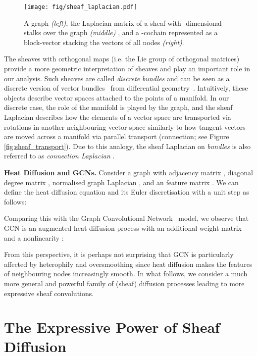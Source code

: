 \documentclass{article}
\begin{document}
\begin{figure}[t]
    \centering
    \texttt{[image: fig/sheaf\_laplacian.pdf]}
    \caption{A graph \textit{(left)}, the Laplacian matrix of a sheaf with -dimensional stalks over the graph \textit{(middle)} , and a -cochain  represented as a block-vector stacking the vectors of all nodes  \textit{(right)}.}
    \label{fig:sheaf_laplacian}
    \vspace{-10pt}
\end{figure}

The sheaves with orthogonal maps (i.e.  the Lie group of  orthogonal matrices) provide a more geometric interpretation of sheaves and play an important role in our analysis. Such sheaves are called \emph{discrete}  \emph{bundles} and can be seen as a discrete version of vector bundles~\citep{zein2009local, scoccola2021approximate, gao2021geometry} from differential geometry~\citep{tu2011manifolds}. Intuitively, these objects describe vector spaces attached to the points of a manifold. In our discrete case, the role of the manifold is played by the graph, and the sheaf Laplacian describes how the elements of a vector space are transported via rotations in another neighbouring vector space similarly to how tangent vectors are moved across a manifold via parallel transport (connection; see Figure \ref{fig:sheaf_transport}). Due to this analogy, the sheaf Laplacian on  \emph{bundles} is also referred to as {\em connection Laplacian} \citep{singer2012vector}.

\textbf{Heat Diffusion and GCNs. } Consider a graph with adjacency matrix , diagonal degree matrix , normalised graph Laplacian , and an  feature matrix . We can define the heat diffusion equation and its Euler discretisation with a unit step as follows: 

Comparing this with the Graph Convolutional Network~\citep{kipf2017graph} model, we observe that GCN is an augmented heat diffusion process with an additional  weight matrix  and a nonlinearity :

From this perspective, it is perhaps not surprising that GCN is particularly affected by heterophily and oversmoothing since heat diffusion makes the features of neighbouring nodes increasingly smooth. In what follows, we consider a much more general and powerful family of (sheaf) diffusion processes leading to more expressive sheaf convolutions. 

\section{The Expressive Power of Sheaf Diffusion}\label{sec:diffusion_power_big}
\end{document}
